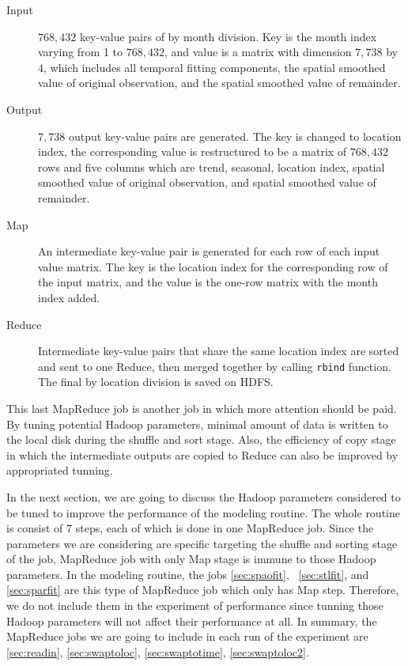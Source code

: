 \begin{description}
\item[Input] $768,432$ key-value pairs of by month division. Key is the month 
index varying from 1 to $768,432$, and value is a matrix with dimension $7,738$ 
by $4$, which includes all temporal fitting components, the spatial smoothed value
of original observation, and the spatial smoothed value of remainder.
\item[Output] $7,738$ output key-value pairs are generated. The key is changed
to location index, the corresponding value is restructured to be a matrix of 
$768,432$ rows and five columns which are trend, seasonal, location index, spatial 
smoothed value of original observation, and spatial smoothed value of remainder. 
\item[Map] An intermediate key-value pair is generated for each row of each input
value matrix. The key is the location index for the corresponding row of the 
input matrix, and the value is the one-row matrix with the month index added.
\item[Reduce] Intermediate key-value pairs that share the same location index are 
sorted and sent to one Reduce, then merged together by calling \texttt{rbind}
function. The final by location division is saved on HDFS.
\end{description}

This last MapReduce job is another job in which more attention should be paid.
By tuning potential Hadoop parameters, minimal amount of data is written to the
local disk during the shuffle and sort stage. Also, the efficiency of copy stage 
in which the intermediate outputs are copied to Reduce can also be improved by
appropriated tunning.

In the next section, we are going to discuss the Hadoop parameters considered to
be tuned to improve the performance of the modeling routine. The whole routine is
consist of 7 steps, each of which is done in one MapReduce job. Since the parameters
we are considering are specific targeting the shuffle and sorting stage of the
job, MapReduce job with only Map stage is immune to those Hadoop parameters.
In the modeling routine, the jobs \ref{sec:spaofit}, ~\ref{sec:stlfit}, and 
\ref{sec:sparfit} are this type of MapReduce job which only has Map step. 
Therefore, we do not include them in the experiment of performance since tunning
those Hadoop parameters will not affect their performance at all. In summary, 
the MapReduce jobs we are going to include in each run of the experiment are
\ref{sec:readin}, \ref{sec:swaptoloc}, \ref{sec:swaptotime}, \ref{sec:swaptoloc2}.
